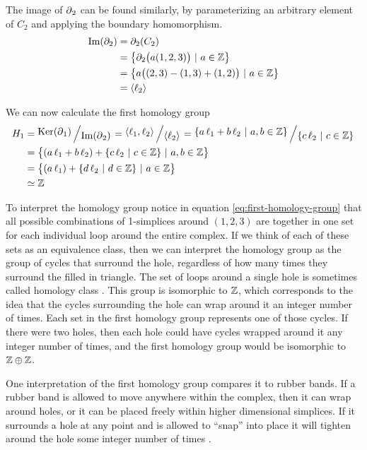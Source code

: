 \begin{example}
    The image of \(\operatorname{\partial}_2\) can be found similarly, by parameterizing an arbitrary element of \(C_2\) and applying the boundary homomorphism.
    \begin{align}
        \operatorname{Im} (\partial_2)   &= \partial_2 (C_2) \\
            &= \left\{ \partial_2 \big( a(1,2,3) \big)\ |\ a \in \mathbb{Z} \right\} \\
            &= \left\{ a\big((2,3) - (1,3) + (1,2) \big)\ |\ a \in \mathbb{Z} \right\}\\
            &= \langle \ell_2 \rangle
    \end{align}

    We can now calculate the first homology group
    \begin{align}
        H_1 &= \bigslant{\Ker(\boundary_1)}{\Ima(\boundary_{2})}
        = \bigslant{\langle \ell_1, \ell_2 \rangle}{\langle \ell_2 \rangle}
        = \bigslant{\{ a\,\ell_1 + b\,\ell_2\ |\ a,b \in \Z \}}{\{ c\,\ell_2\ |\ c \in \Z \}} \\
        &= \big\{ (a\,\ell_1 + b\,\ell_2) + \{ c\,\ell_2\ |\ c \in \Z \}\ |\ a,b \in \Z \big\} \\
        &= \big\{ (a\,\ell_1) + \{ d\,\ell_2\ |\ d \in \Z \}\ |\ a \in \Z \big\} \label{eq:first-homology-group}\\
        &\simeq \Z
    \end{align}

    To interpret the homology group notice in equation \eqref{eq:first-homology-group} that all possible combinations of 1-simplices around \((1,2,3)\) are together in one set for each individual loop around the entire complex.
    If we think of each of these sets as an equivalence class, then we can interpret the homology group as the group of cycles that surround the hole, regardless of how many times they surround the filled in triangle.
    The set of loops around a single hole is sometimes called homology class .
    This group is isomorphic to \(\mathbb{Z}\), which corresponds to the idea that the cycles surrounding the hole can wrap around it an integer number of times.
    Each set in the first homology group represents one of those cycles.
    If there were two holes, then each hole could have cycles wrapped around it any integer number of times, and the first homology group would be isomorphic to \(\mathbb{Z} \oplus \mathbb{Z}\).

    One interpretation of the first homology group compares it to rubber bands.
    If a rubber band is allowed to move anywhere within the complex, then it can wrap around holes, or it can be placed freely within higher dimensional simplices.
    If it surrounds a hole at any point and is allowed to ``snap'' into place it will tighten around the hole some integer number of times .
\end{example}

